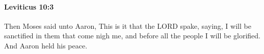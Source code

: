 
		\paragraph{Leviticus 10:3} %
			\label{LEVITICUS-10-3}

			Then Moses said unto Aaron, This is it that the LORD spake, saying, I will be sanctified in them that come nigh me, and before all the people I will be glorified. And Aaron held his peace.


